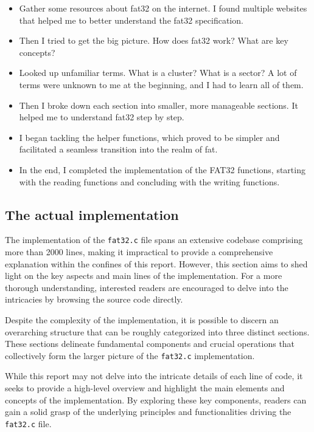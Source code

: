 \begin{itemize}
    \item  Gather some resources about fat32 on the internet. I found multiple websites that helped me to better understand the fat32 specification. 
    \item  Then I tried to get the big picture. How does fat32 work? What are key concepts?
    \item  Looked up unfamiliar terms. What is a cluster? What is a sector? A lot of terms were unknown to me at the beginning, and I had to learn all of them.
    \item Then I broke down each section into smaller, more manageable sections. It helped me to understand fat32 step by step.
    \item I began tackling the helper functions, which proved to be simpler and facilitated a seamless transition into the realm of fat.
    \item In the end, I completed the implementation of the FAT32 functions, starting with the reading functions and concluding with the writing functions.
\end{itemize}

\subsection{The actual implementation}

The implementation of the \texttt{fat32.c} file spans an extensive codebase comprising more than 2000 lines, making it impractical to provide a comprehensive explanation within the confines of this report. However, this section aims to shed light on the key aspects and main lines of the implementation. For a more thorough understanding, interested readers are encouraged to delve into the intricacies by browsing the source code directly.

Despite the complexity of the implementation, it is possible to discern an overarching structure that can be roughly categorized into three distinct sections. These sections delineate fundamental components and crucial operations that collectively form the larger picture of the \texttt{fat32.c} implementation.

While this report may not delve into the intricate details of each line of code, it seeks to provide a high-level overview and highlight the main elements and concepts of the implementation. By exploring these key components, readers can gain a solid grasp of the underlying principles and functionalities driving the \texttt{fat32.c} file.

